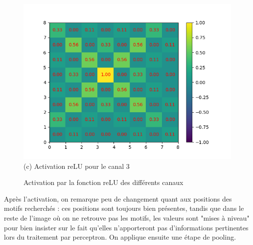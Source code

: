 \begin{figure}[h]
    \endminipage\hfill
        \includegraphics[width=\textwidth]{img/cnn_exemple/cross/activation_relu_3.png}
        \center
        (c) Activation reLU pour le canal 3
    \endminipage 
    \caption{Activation par la fonction reLU des différents canaux}
\end{figure}

Après l'activation, on remarque peu de changement quant aux positions des motifs recherchés : 
ces positions sont toujours bien présentes, tandis que dans le reste de l'image où on ne retrouve pas les motifs, 
les valeurs sont "mises à niveau" pour bien insister sur le fait qu'elles n'apporteront pas d'informations pertinentes 
lors du traitement par perceptron.
On applique ensuite une étape de pooling.

